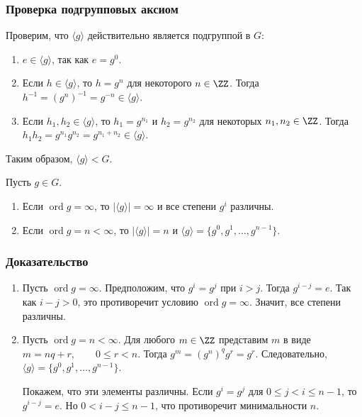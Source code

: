 \subsubsection*{Проверка подгрупповых аксиом}

Проверим, что $\langle g \rangle$ действительно является подгруппой в $G$:
\begin{enumerate}
	\item $e \in \langle g \rangle$, так как $e = g^0$.
	
	\item Если $h \in \langle g \rangle$, то $h = g^n$ для некоторого $n \in \ZZ$. Тогда $h^{-1} = (g^n)^{-1} = g^{-n} \in \langle g \rangle.$
	
	\item Если $h_1,h_2 \in \langle g \rangle$, то $h_1 = g^{n_1}$ и $h_2 = g^{n_2}$ для некоторых $n_1,n_2 \in \ZZ$. Тогда $h_1h_2 = g^{n_1}g^{n_2} = g^{n_1+n_2} \in \langle g \rangle.$
\end{enumerate}

Таким образом, $\langle g \rangle < G.$

\begin{Proposition}{}{}
	Пусть $g \in G$.
	\begin{enumerate}
		\item Если $\operatorname{ord} g = \infty$, то $|\langle g \rangle| = \infty$ и все степени $g^i$ различны.
		\item Если $\operatorname{ord} g = n < \infty$, то $|\langle g \rangle| = n$
		и $\langle g \rangle = \{g^0,g^1,\dots,g^{n-1}\}.$
	\end{enumerate}
\end{Proposition}

\subsubsection*{Доказательство}

\begin{enumerate}
	\item Пусть $\operatorname{ord} g = \infty$. Предположим, что $g^i = g^j$ при $i > j$. Тогда $g^{i-j} = e.$
	Так как $i-j > 0$, это противоречит условию $\operatorname{ord} g = \infty$. Значит, все степени различны.
	
	\item Пусть $\operatorname{ord} g = n < \infty$. Для любого $m \in \ZZ$ представим $m$ в виде $m = nq + r, \qquad 0 \le r < n.$
	Тогда $g^m = (g^n)^qg^r = g^r.$
	Следовательно, $\langle g \rangle = \{g^0,g^1,\dots,g^{n-1}\}.$
	
	Покажем, что эти элементы различны. Если $g^i = g^j$ для $0 \le j < i \le n-1$, то $g^{i-j} = e.$
	Но $0 < i-j \le n-1$, что противоречит минимальности $n$.
\end{enumerate}

